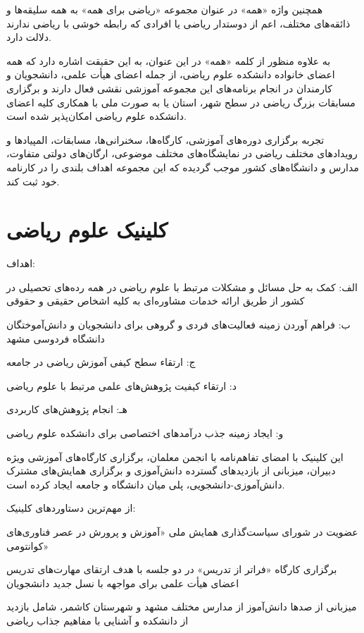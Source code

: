 \documentclass[
  letterpaper,
  DIV=11,
  numbers=noendperiod]{scrreprt}
\begin{document}
همچنین واژه «همه» در عنوان مجموعه «ریاضی برای همه» به همه سلیقه‌ها و
ذائقه‌های مختلف، اعم از دوستدار ریاضی یا افرادی که رابطه خوشی با ریاضی
ندارند دلالت دارد.

به علاوه منظور از کلمه «همه» در این عنوان، به این حقیقت اشاره دارد که
همه اعضای خانواده دانشکده علوم ریاضی، از جمله اعضای هیأت علمی، دانشجویان
و کارمندان در انجام برنامه‌های این مجموعه آموزشی نقشی فعال دارند و
برگزاری مسابقات بزرگ ریاضی در سطح شهر، استان یا به صورت ملی با همکاری
کلیه اعضای دانشکده علوم ریاضی امکان‌پذیر شده است.

تجربه برگزاری دوره‌های آموزشی، کارگاه‌ها، سخنرانی‌ها، مسابقات، المپیادها و
رویدادهای مختلف ریاضی در نمایشگاه‌های مختلف موضوعی، ارگان‌های دولتی
متفاوت، مدارس و دانشگاه‌های کشور موجب گردیده که این مجموعه اهداف بلندی را
در کارنامه خود ثبت کند.

\section{کلینیک علوم
ریاضی}\label{ux6a9ux644ux6ccux646ux6ccux6a9-ux639ux644ux648ux645-ux631ux6ccux627ux636ux6cc}

اهداف:

الف: کمک به حل مسائل و مشکلات مرتبط با علوم ریاضی در همه رده‌های تحصیلی
در کشور از طریق ارائه خدمات مشاوره‌ای به کلیه اشخاص حقیقی و حقوقی

ب: فراهم آوردن زمینه فعالیت‌های فردی و گروهی برای دانشجویان و
دانش‌آموختگان دانشگاه فردوسی مشهد

ج: ارتقاء سطح کیفی آموزش ریاضی در جامعه

د: ارتقاء کیفیت پژوهش‌های علمی مرتبط با علوم ریاضی

هـ: انجام پژوهش‌های کاربردی

و: ایجاد زمینه جذب درآمدهای اختصاصی برای دانشکده علوم ریاضی

این کلینیک با امضای تفاهم‌نامه با انجمن معلمان، برگزاری کارگاه‌های آموزشی
ویژه دبیران، میزبانی از بازدیدهای گسترده دانش‌آموزی و برگزاری همایش‌های
مشترک دانش‌آموزی-دانشجویی، پلی میان دانشگاه و جامعه ایجاد کرده است.

از مهم‌ترین دستاوردهای کلینیک:

عضویت در شورای سیاست‌گذاری همایش ملی «آموزش و پرورش در عصر فناوری‌های
کوانتومی»

برگزاری کارگاه «فراتر از تدریس» در دو جلسه با هدف ارتقای مهارت‌های تدریس
اعضای هیأت علمی برای مواجهه با نسل جدید دانشجویان

میزبانی از صدها دانش‌آموز از مدارس مختلف مشهد و شهرستان کاشمر، شامل
بازدید از دانشکده و آشنایی با مفاهیم جذاب ریاضی
\end{document}
